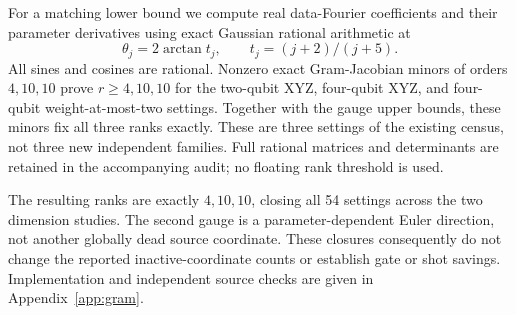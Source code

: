 For a matching lower bound we compute real data-Fourier coefficients
and their parameter derivatives using exact Gaussian rational
arithmetic at
\begin{equation}
 \theta_j=2\arctan t_j,\qquad t_j=(j+2)/(j+5).
\end{equation}
All sines and cosines are rational. Nonzero exact Gram-Jacobian minors
of orders $4,10,10$ prove $r\ge4,10,10$ for the two-qubit XYZ,
four-qubit XYZ, and four-qubit weight-at-most-two settings. Together
with the gauge upper bounds, these minors fix all three ranks exactly.
These are three settings of the existing census, not three new
independent families. Full rational matrices and determinants are
retained in the accompanying audit; no floating rank threshold is used.

The resulting ranks are exactly $4,10,10$, closing all 54 settings
across the two dimension studies. The second gauge is a
parameter-dependent Euler direction, not another globally dead
source coordinate. These closures consequently do not change the
reported inactive-coordinate counts or establish gate or shot savings.
Implementation and independent source checks are given in
Appendix~\ref{app:gram}.
